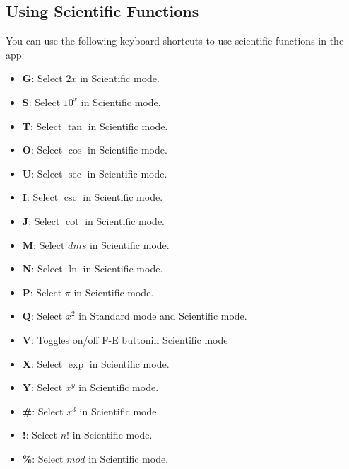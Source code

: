 \documentclass[12pt]{article}
\begin{document}
\subsection{Using Scientific Functions}
You can use the following keyboard shortcuts to use scientific functions in the app\cite{calculator-shortcuts}:

\begin{itemize}
    \item \textbf{G}: Select $2x$ in Scientific mode.
    \item \textbf{S}: Select $10^x$ in Scientific mode.
    \item \textbf{T}: Select $\tan$ in Scientific mode.
    \item \textbf{O}: Select $\cos$ in Scientific mode.
    \item \textbf{U}: Select $\sec$ in Scientific mode.
    \item \textbf{I}: Select $\csc$ in Scientific mode.
    \item \textbf{J}: Select $\cot$ in Scientific mode.
    \item \textbf{M}: Select $dms$ in Scientific mode.
    \item \textbf{N}: Select $\ln$ in Scientific mode.
    \item \textbf{P}: Select $\pi$ in Scientific mode.
    \item \textbf{Q}: Select $x^2$ in Standard mode and Scientific mode.
    \item \textbf{V}: Toggles on/off F-E buttonin Scientific mode
    \item \textbf{X}: Select $\exp$ in Scientific mode.
    \item \textbf{Y}: Select $x^y$ in Scientific mode.
    \item \textbf{\#}: Select $x^3$ in Scientific mode.
    \item \textbf{!}: Select $n!$ in Scientific mode.
    \item \textbf{\%}: Select $mod$ in Scientific mode.
\end{itemize}

\pagebreak

\printbibliography
\end{document}
